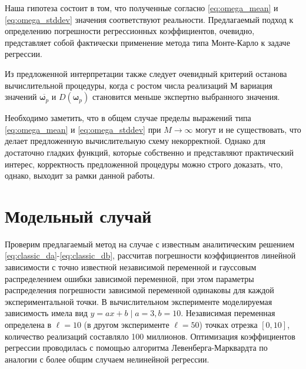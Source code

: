 \documentclass[11pt,a4paper]{article}
\theoremstyle{definition}
\begin{document}
Наша гипотеза состоит в том, что полученные согласно \eqref{eq:omega_mean} и \eqref{eq:omega_stddev}
значения соответствуют реальности. Предлагаемый подход к определению
погрешности регрессионных коэффициентов, очевидно, представляет собой
фактически применение метода типа Монте-Карло к задаче регрессии.

Из предложенной интерпретации также следует очевидный критерий
останова вычислительной процедуры, когда с ростом числа реализаций $М$
вариация значений $\overline{\boldsymbol{\omega}_p}$ и
$D(\boldsymbol{\omega}_p)$ становится меньше экспертно выбранного
значения.

Необходимо заметить, что в общем случае пределы выражений типа
\eqref{eq:omega_mean} и \eqref{eq:omega_stddev}
при $M \rightarrow \infty$ могут и не существовать, что делает предложенную
вычислительную схему некорректной. Однако для достаточно гладких
функций, которые собственно и представляют практический интерес,
корректность предложенной процедуры можно строго доказать, что, однако,
выходит за рамки данной работы.

\section{Модельный случай}

Проверим предлагаемый метод на случае с известным аналитическим
решением \eqref{eq:classic_da}-\eqref{eq:classic_db}, рассчитав
погрешности коэффициентов линейной зависимости с точно
известной независимой переменной и гауссовым
распределением ошибки зависимой переменной, при этом параметры
распределения погрешности зависимой переменной одинаковы для каждой
экспериментальной точки.
В вычислительном эксперименте моделируемая зависимость имела вид
$y = ax + b \mid a = 3, b = 10$. Независимая переменная
определена в $\ell = 10$ (в другом эксперименте $\ell = 50$) точках
отрезка $[0, 10]$, количество реализаций
составляло 100 миллионов. Оптимизация коэффициентов регрессии проводилась с помощью
алгоритма Левенберга-Марквардта по аналогии с более общим
случаем нелинейной регрессии.
\end{document}
